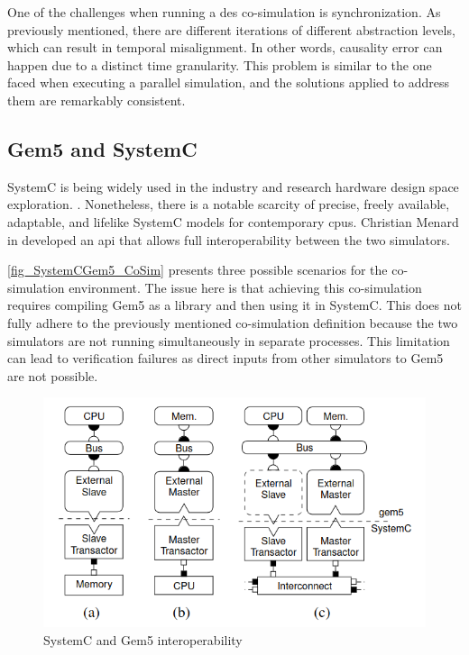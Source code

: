 One of the challenges when running a \gls{des} co-simulation is synchronization. As previously mentioned, there are different iterations of different abstraction levels, which can result in temporal misalignment. In other words, causality error can happen due to a distinct time granularity. This problem is similar to the one faced when executing a parallel simulation, and the solutions applied to address them are remarkably consistent. 


\subsection{Gem5 and SystemC}

SystemC is being widely used in the industry and research hardware design space exploration. \cite{menard2017system}. Nonetheless, there is a notable scarcity of precise, freely available, adaptable, and lifelike SystemC models for contemporary \glspl{cpu}. Christian Menard in \cite{menard2017system} developed an \gls{api} that allows full interoperability between the two simulators. 

\autoref{fig_SystemCGem5_CoSim} presents three possible scenarios for the co-simulation environment. The issue here is that achieving this co-simulation requires compiling Gem5 as a library and then using it in SystemC. This does not fully adhere to the previously mentioned co-simulation definition because the two simulators are not running simultaneously in separate processes. This limitation can lead to verification failures as direct inputs from other simulators to Gem5 are not possible.

\begin{figure}[H]
	\centering
 	\includegraphics[width=0.7\linewidth]{Images/SystemCGem5_CoSim.png}
 	\caption{SystemC and Gem5 interoperability \cite{menard2017system}}
	 \label{fig_SystemCGem5_CoSim}
\end{figure}
